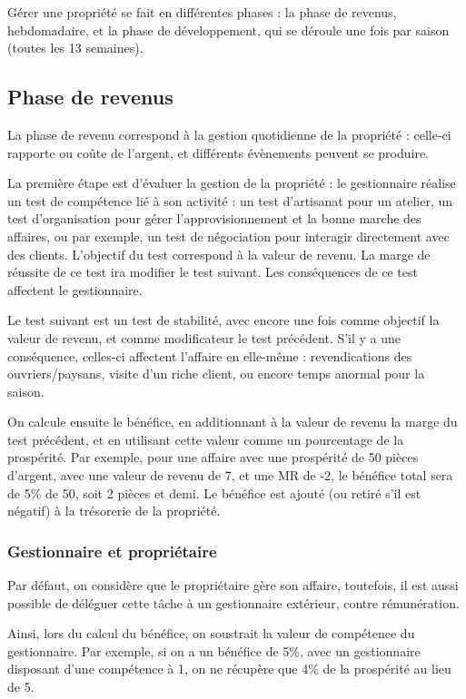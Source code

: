 \documentclass[10pt,a4paper]{book}
\begin{document}
\begin{multicols}{2}
Gérer une propriété se fait en différentes phases : la phase de revenus, hebdomadaire, et la phase de développement, qui se déroule une fois par saison (toutes les 13 semaines). 

\subsection{Phase de revenus}
La phase de revenu correspond à la gestion quotidienne de la propriété : celle-ci rapporte ou coûte de l'argent, et différents évènements peuvent se produire.

La première étape est d'évaluer la gestion de la propriété : le gestionnaire réalise un test de compétence lié à son activité : un test d'artisanat pour un atelier, un test d'organisation pour gérer l'approvisionnement et la bonne marche des affaires, ou par exemple, un test de négociation pour interagir directement avec des clients. L'objectif du test correspond à la valeur de revenu. La marge de réussite de ce test ira modifier le test suivant. Les conséquences de ce test affectent le gestionnaire.

Le test suivant est un test de stabilité, avec encore une fois comme objectif la valeur de revenu, et comme modificateur le test précédent. S'il y a une conséquence, celles-ci affectent l'affaire en elle-même : revendications des ouvriers/paysans, visite d'un riche client, ou encore temps anormal pour la saison.

On calcule ensuite le bénéfice, en additionnant à la valeur de revenu la marge du test précédent, et en utilisant cette valeur comme un pourcentage de la prospérité. Par exemple, pour une affaire avec une prospérité de 50 pièces d'argent, avec une valeur de revenu de 7, et une MR de -2, le bénéfice total sera de 5\% de 50, soit 2 pièces et demi. Le bénéfice est ajouté (ou retiré s'il est négatif) à la trésorerie de la propriété.
\subsubsection{Gestionnaire et propriétaire}
Par défaut, on considère que le propriétaire gère son affaire, toutefois, il est aussi possible de déléguer cette tâche à un gestionnaire extérieur, contre rémunération. 

Ainsi, lors du calcul du bénéfice, on soustrait la valeur de compétence du gestionnaire. Par exemple, si on a un bénéfice de 5\%, avec un gestionnaire disposant d'une compétence à 1, on ne récupère que 4\% de la prospérité au lieu de 5.


\end{multicols}
\end{document}
